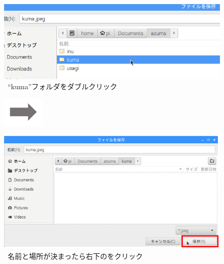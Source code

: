 \begin{figure}[t]
  \begin{minipage}{0.4\textwidth}
    \includegraphics[width=\linewidth]{text01-img/textbook-img100.png}
     \ “kuma”フォルダをダブルクリック
  \end{minipage}
  \includegraphics[width=2cm]{text01-img/textbook-img073.png}
  \begin{minipage}{0.4\textwidth}
    \includegraphics[width=\linewidth]{text01-img/textbook-img099.png}
     \ 名前と場所が決まったら右下のをクリック
  \end{minipage}

  \bigskip


\end{figure}
